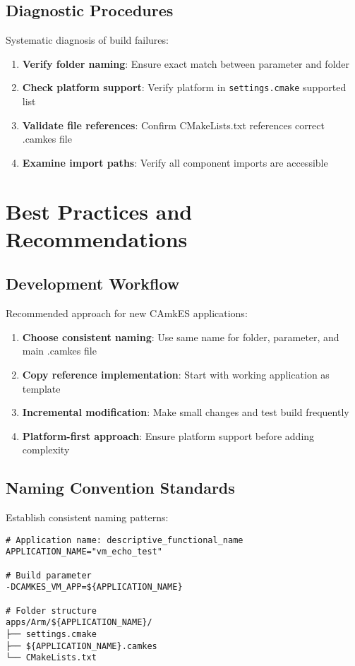 \documentclass[12pt,a4paper]{article}
\begin{document}
\subsection{Diagnostic Procedures}

Systematic diagnosis of build failures:

\begin{enumerate}
\item \textbf{Verify folder naming}: Ensure exact match between parameter and folder
\item \textbf{Check platform support}: Verify platform in \texttt{settings.cmake} supported list
\item \textbf{Validate file references}: Confirm CMakeLists.txt references correct .camkes file
\item \textbf{Examine import paths}: Verify all component imports are accessible
\end{enumerate}

\section{Best Practices and Recommendations}

\subsection{Development Workflow}

Recommended approach for new CAmkES applications:

\begin{enumerate}
\item \textbf{Choose consistent naming}: Use same name for folder, parameter, and main .camkes file
\item \textbf{Copy reference implementation}: Start with working application as template
\item \textbf{Incremental modification}: Make small changes and test build frequently
\item \textbf{Platform-first approach}: Ensure platform support before adding complexity
\end{enumerate}

\subsection{Naming Convention Standards}

Establish consistent naming patterns:

\begin{lstlisting}[style=bash, caption=Recommended naming pattern]
# Application name: descriptive_functional_name
APPLICATION_NAME="vm_echo_test"

# Build parameter
-DCAMKES_VM_APP=${APPLICATION_NAME}

# Folder structure  
apps/Arm/${APPLICATION_NAME}/
├── settings.cmake
├── ${APPLICATION_NAME}.camkes
└── CMakeLists.txt
\end{lstlisting}
\end{document}
